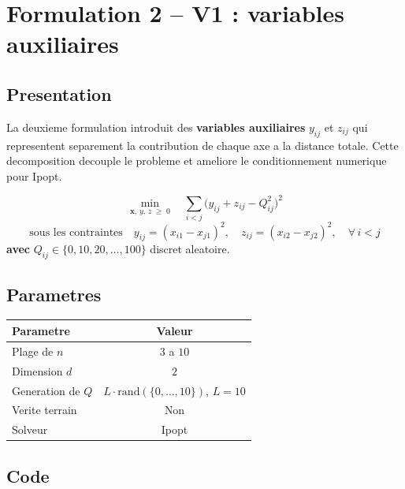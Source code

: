 \documentclass[12pt,a4paper]{article}
\begin{document}
\newpage

\section{Formulation 2 -- V1 : variables auxiliaires}

\subsection{Presentation}

La deuxieme formulation introduit des \textbf{variables auxiliaires}
$y_{ij}$ et $z_{ij}$ qui representent separement la contribution de
chaque axe a la distance totale.  Cette decomposition decouple le
probleme et ameliore le conditionnement numerique pour Ipopt.

\begin{objetifbox}
\[
  \min_{\mathbf{x},\,y,\,z \;\geq\; 0} \quad
  \sum_{i < j}
  \bigl( y_{ij} + z_{ij} - Q_{ij}^2 \bigr)^2
\]
\[
  \text{sous les contraintes} \quad
  y_{ij} = (x_{i1} - x_{j1})^2, \quad
  z_{ij} = (x_{i2} - x_{j2})^2, \quad
  \forall\, i < j
\]
\textbf{avec} $Q_{ij} \in \{0,10,20,\ldots,100\}$ discret aleatoire.
\end{objetifbox}

\subsection{Parametres}

\begin{center}
\begin{tabular}{lc}
\toprule
\textbf{Parametre} & \textbf{Valeur} \\
\midrule
Plage de $n$          & $3$ a $10$ \\
Dimension $d$         & $2$ \\
Generation de $Q$     & $L \cdot \mathrm{rand}(\{0,\ldots,10\})$, $L=10$ \\
Verite terrain        & Non \\
Solveur               & Ipopt \\
\bottomrule
\end{tabular}
\end{center}

\subsection{Code}
\end{document}
